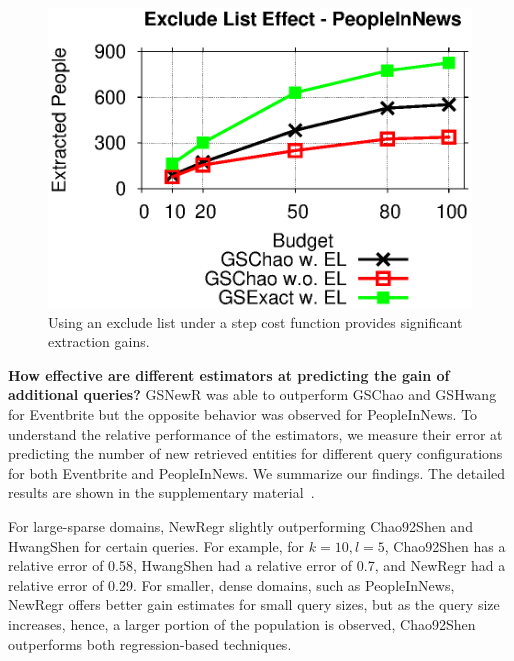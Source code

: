 \begin{figure}[t]
	\begin{center}
	\includegraphics[clip,scale=0.5]{figs/exEffect.eps}
	\caption{Using an exclude list under a step cost function provides significant extraction gains.}
	\label{fig:exEffect}
	\end{center}
\end{figure}

\noindent\textbf{How effective are different estimators at predicting the gain of additional queries?}
GSNewR was able to outperform GSChao and GSHwang for Eventbrite but the opposite behavior was observed for PeopleInNews. To understand the relative performance of the estimators, we measure their error at predicting the number of new retrieved entities for different query configurations for both Eventbrite and PeopleInNews. We summarize our findings. The detailed results are shown in the supplementary material~\cite{cruxsup}.

For large-sparse domains, NewRegr slightly outperforming Chao92Shen and HwangShen for certain queries. For example, for $k = 10, l = 5$, Chao92Shen has a relative error of 0.58, HwangShen had a relative error of 0.7, and NewRegr had a relative error of 0.29. For smaller, dense domains, such as PeopleInNews, NewRegr offers better gain estimates for small query sizes, but as the query size increases, hence, a larger portion of the population is observed, Chao92Shen outperforms both regression-based techniques. 




